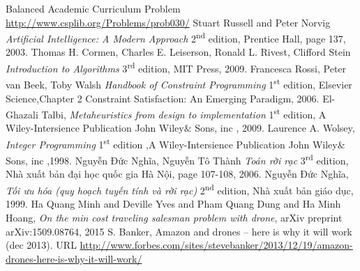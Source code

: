\documentclass[a4paper,12pt]{report}
\begin{document}
\begin{thebibliography}{9}
 Balanced Academic Curriculum Problem  \url{http://www.csplib.org/Problems/prob030/}
 Stuart Russell and Peter Norvig 
\textit{Artificial Intelligence: A Modern Approach} 2\textsuperscript{nd } edition, Prentice Hall, page 137,  2003.
 Thomas H. Cormen, Charles E. Leiserson, Ronald L. Rivest, Clifford Stein 
\textit{Introduction to Algorithms} 3\textsuperscript{rd } edition, MIT Press,  2009.
 Francesca Rossi, Peter van Beek, Toby Walsh 
\textit{Handbook of Constraint Programming} 1\textsuperscript{st} edition, Elsevier Science,Chapter 2 Constraint Satisfaction:
An Emerging Paradigm,  2006.
 El-Ghazali Talbi,
\textit{Metaheuristics
from design to implementation} 1\textsuperscript{st} edition, A Wiley-Intersience Publication John Wiley$\&$ Sons, inc ,  2009.
Laurence A. Wolsey,
\textit{Integer Programming} 1\textsuperscript{st} edition
,A Wiley-Intersience Publication John Wiley$\&$ Sons, inc 
,1998.
 Nguyễn Đức Nghĩa, Nguyễn Tô Thành 
\textit{Toán rời rạc} 3\textsuperscript{rd} edition, Nhà xuất bản đại học quốc gia Hà Nội, page 107-108,  2006.
 Nguyễn Đức Nghĩa,  
\textit{Tối ưu hóa (quy hoạch tuyến tính và rời rạc)} 2\textsuperscript{nd} edition, Nhà xuất bản giáo dục,  1999.
 Ha Quang Minh and Deville Yves and Pham Quang Dung and Ha Minh Hoang, \textit{On the min cost traveling salesman problem with drone}, arXiv preprint arXiv:1509.08764, 2015
 S. Banker, Amazon and drones – here is why it will work (dec 2013).
URL \url{http://www.forbes.com/sites/stevebanker/2013/12/19/amazon-drones-here-is-why-it-will-work/}


\end{thebibliography}
\end{document}
